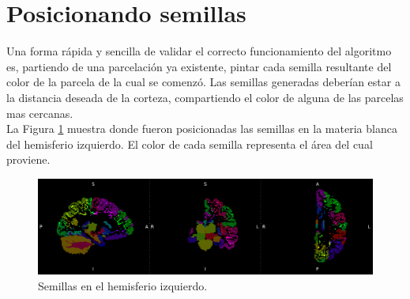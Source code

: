 \section{Posicionando semillas}

Una forma r\'apida y sencilla de validar el correcto funcionamiento del algoritmo
es, partiendo de una parcelaci\'on ya existente, pintar cada semilla resultante 
del color de la parcela de la cual se comenz\'o. Las semillas generadas deber\'ian
estar a la distancia deseada de la corteza, compartiendo el color de alguna de
las parcelas mas cercanas.\\

La Figura \ref{fig:semillas} muestra donde fueron posicionadas las semillas en
la materia blanca del hemisferio izquierdo. El color de cada semilla representa
el \'area del cual proviene.

\begin{figure}[h!]
   \centering
    \includegraphics[width=\textwidth]{img/painted_seeds.png}
    \caption{Semillas en el hemisferio izquierdo. }
    \label{fig:semillas}
\end{figure}

